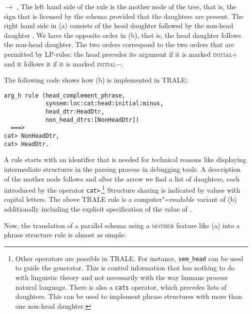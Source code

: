 \ex {} $\to$ , 
\zl
The left hand side of the rule is the mother node of the tree, that is, the sign that is licensed by
the schema provided that the daughters are present. The right hand side in (a) consists of
the head daughter  followed by the non-head daughter . We have the opposite order
in (b), that is, the head daughter follows the non-head daughter. The two orders correspond
to the two orders that are permitted by LP-rules: the head precedes its argument if it is marked
\textsc{initial}+ and it follows it if it is marked \textsc{initial}$-$.

The following code shows how (b) is implemented in TRALE:
\begin{verbatim}
arg_h rule (head_complement_phrase,
            synsem:loc:cat:head:initial:minus,
            head_dtr:HeadDtr,
            non_head_dtrs:[NonHeadDtr])
  ===>
cat> NonHeadDtr,
cat> HeadDtr.
\end{verbatim}
A rule starts with an identifier that is needed for technical reasons like displaying intermediate
structures in the parsing process in debugging tools. A description of the mother node follows and
after the arrow we find a list of daughters, each introduced by the operator \verb+cat>+.\footnote{%
  Other operators are possible in TRALE. For instance, \texttt{sem\_head} can be used to guide the
  generator. This is control information that has nothing to do with linguistic theory and not
  necessarily with the way humans process natural language. There is also a \texttt{cats} operator,
  which precedes lists of daughters. This can be used to implement phrase structures with more than
  one non-head daughter.%
}
Structure sharing is indicated by values with capital letters. The above TRALE rule is a
computer"=readable variant of (b) additionally including the explicit specification of the value of {\initial}.  

Now, the translation of a parallel schema using a \textsc{mother} feature like (a) into a phrase structure rule is almost as simple:
\eal
\ex {}

